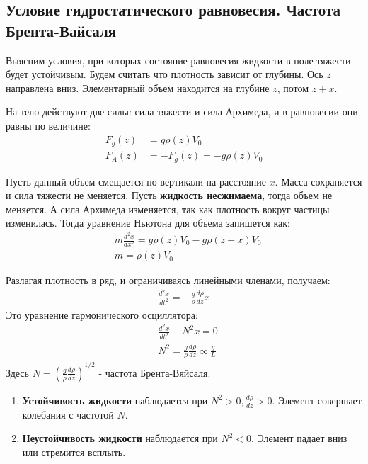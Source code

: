 \subsection{Условие гидростатического равновесия. Частота Брента-Вайсаля}
Выясним условия, при  которых состояние равновесия жидкости в поле тяжести будет устойчивым.
Будем считать что плотность зависит от глубины. Ось $z$ направлена вниз. Элементарный  объем   находится на глубине $z$, потом $z+x$.

На тело действуют две силы: сила тяжести и сила Архимеда, и в равновесии они равны  по величине:
\begin{align*}
F _ { g } ( z ) &= g \rho ( z ) V _ { 0 } \\
F _ { A } ( z ) &= - F _ { g } ( z ) = - g \rho ( z ) V _ { 0 }
\end{align*}

Пусть данный объем смещается по вертикали на расстояние $x$. Масса сохраняется и сила тяжести не меняется.  Пусть \textbf{жидкость несжимаема}, тогда объем не меняется. А сила Архимеда изменяется, так как плотность вокруг частицы изменилась. Тогда уравнение  Ньютона для объема запишется как:
\begin{align*}
& m \frac { d ^ { 2 } x } { d x ^ { 2 } } = g \rho ( z ) V _ { 0 } - g \rho ( z + x ) V _ { 0 } \\
& m = \rho ( z ) V _ { 0 }
\end{align*}

Разлагая плотность в ряд, и ограничиваясь линейными членами, получаем:
\begin{align*}
\frac { d ^ { 2 } x } { d t ^ { 2 } } = - \frac { g } { \rho } \frac { d \rho } { d z } x
\end{align*}
Это уравнение гармонического осциллятора:
\begin{align*}
& \frac { d ^ { 2 } x } { d t ^ { 2 } } + N ^ { 2 } x = 0 \\
& N ^ { 2 } = \frac { g } { \rho } \frac { d \rho } { d z } \propto \frac { g } { L }
\end{align*}
Здесь $ N = \left( \frac { g } { \rho } \frac { d \rho } { d z } \right) ^ { 1 / 2 } $ - частота Брента-Вяйсаля.
\begin{enumerate}
	\item {\textbf{Устойчивость жидкости} наблюдается при $ N ^ { 2 } > 0 , \frac { d \rho } { d z } > 0$. Элемент совершает колебания с частотой $N$.}
	\item {\textbf{Неустойчивость жидкости} наблюдается при $ N ^ { 2 } < 0 $. Элемент падает вниз или стремится всплыть.}
\end{enumerate}
